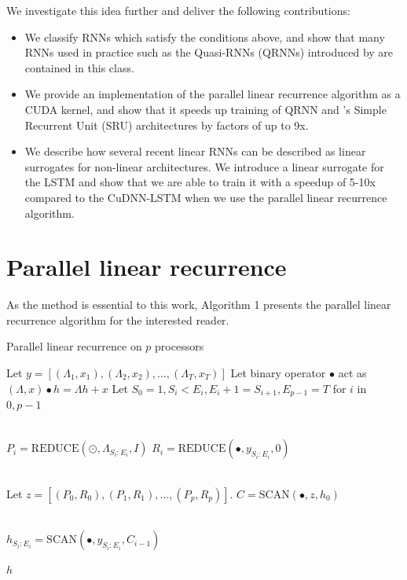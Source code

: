 \documentclass{article}
\providecommand{\scan}{\text{SCAN}}
\providecommand{\reduce}{\text{REDUCE}}
\begin{document}
We investigate this idea further and deliver the following contributions:
\begin{itemize}
\item{We classify RNNs which satisfy the conditions above, and show that many
    RNNs used in practice such as the Quasi-RNNs (QRNNs) introduced by
    \citet{bradbury2017quasi} are contained in this class.}
\item{We provide an implementation of the parallel linear recurrence algorithm
    as a CUDA kernel, and show that it speeds up training of QRNN and
    \citet{lei2017}'s Simple Recurrent Unit (SRU) architectures by factors of up
    to 9x.}
\item{We describe how several recent linear RNNs can be described as
    linear surrogates for non-linear architectures. We introduce a linear
    surrogate for the LSTM and show that we are able to train it
    with a speedup of 5-10x compared to the CuDNN-LSTM when we use the
    parallel linear recurrence algorithm.}
\end{itemize}

\section{Parallel linear recurrence}
As the method is
essential to this work, Algorithm 1 presents the parallel linear recurrence
algorithm for the interested reader.
\begin{algorithm}
  \label{alg:plr}
\caption{Parallel linear recurrence on $p$ processors}
\begin{algorithmic}[1]
  \State Let $y = [(\Lambda_1, x_1), (\Lambda_2, x_2), ..., (\Lambda_T, x_T)]$
  \State Let binary operator $\bullet$ act as $(\Lambda, x) \bullet h = \Lambda h + x$
  \State Let $S_0=1, S_i < E_i, E_i + 1 = S_{i+1}, E_{p-1}=T$ for $i$ in $0,p-1$

  \\
    \State $P_i = \reduce(\odot, \Lambda_{S_i:E_i}, I)$
    \State $R_i = \reduce(\bullet, y_{S_i:E_i}, 0)$
  \EndParFor

  \\
  \State Let $z = [(P_0, R_0), (P_1, R_1), ..., (P_p, R_p)]$.
  \State $C = \scan(\bullet, z, h_0)$   

  \\
    \State $h_{S_i:E_i} = \scan(\bullet, y_{S_i:E_i}, C_{i-1})$
  \EndParFor

  \State \Return $h$
\end{algorithmic}
\end{algorithm}
\end{document}
